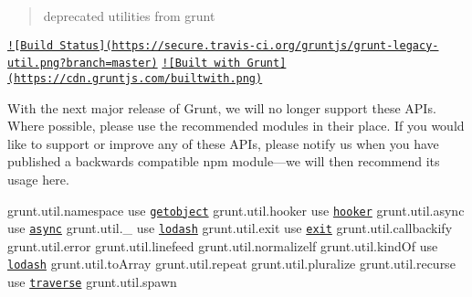 \begin{quote}
deprecated utilities from grunt \end{quote}


\href{http://travis-ci.org/gruntjs/grunt-legacy-util}{\tt !\mbox{[}Build Status\mbox{]}(https\+://secure.\+travis-\/ci.\+org/gruntjs/grunt-\/legacy-\/util.\+png?branch=master)} \href{http://gruntjs.com/}{\tt !\mbox{[}Built with Grunt\mbox{]}(https\+://cdn.\+gruntjs.\+com/builtwith.\+png)}

With the next major release of Grunt, we will no longer support these A\+P\+Is. Where possible, please use the recommended modules in their place. If you would like to support or improve any of these A\+P\+Is, please notify us when you have published a backwards compatible npm module---we will then recommend its usage here.

{\ttfamily grunt.\+util.\+namespace} use \href{https://www.npmjs.org/package/getobject}{\tt getobject} {\ttfamily grunt.\+util.\+hooker} use \href{https://www.npmjs.org/package/hooker}{\tt hooker} {\ttfamily grunt.\+util.\+async} use \href{https://www.npmjs.org/package/async}{\tt async} {\ttfamily grunt.\+util.\+\_\+} use \href{https://www.npmjs.org/package/lodash}{\tt lodash} {\ttfamily grunt.\+util.\+exit} use \href{https://www.npmjs.org/package/exit}{\tt exit} {\ttfamily grunt.\+util.\+callbackify} {\ttfamily grunt.\+util.\+error} {\ttfamily grunt.\+util.\+linefeed} {\ttfamily grunt.\+util.\+normalizelf} {\ttfamily grunt.\+util.\+kind\+Of} use \href{https://www.npmjs.org/package/lodash}{\tt lodash} {\ttfamily grunt.\+util.\+to\+Array} {\ttfamily grunt.\+util.\+repeat} {\ttfamily grunt.\+util.\+pluralize} {\ttfamily grunt.\+util.\+recurse} use \href{https://www.npmjs.org/package/traverse}{\tt traverse} {\ttfamily grunt.\+util.\+spawn} 